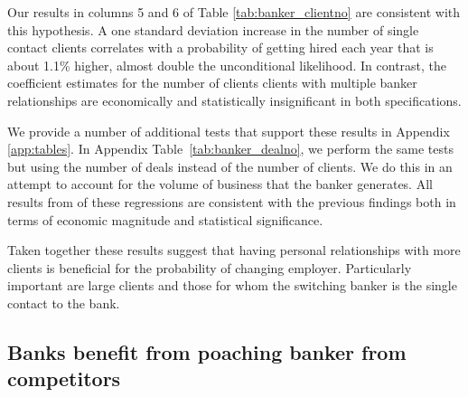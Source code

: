Our results in columns 5 and 6 of Table \ref{tab:banker_clientno} are consistent with this hypothesis. A one standard deviation increase in the number of single contact clients correlates with a probability of getting hired each year that is about 1.1\% higher, almost double the unconditional likelihood. In contrast, the coefficient estimates for the number of clients clients with multiple banker relationships are economically and statistically insignificant in both specifications. %

We provide a number of additional tests that support these results in Appendix \ref{app:tables}. In Appendix Table~\ref{tab:banker_dealno}, we perform the same tests but using the number of deals instead of the number of clients. We do this in an attempt to account for the volume of business that the banker generates.%
All results from of these regressions are consistent with the previous findings both in terms of economic magnitude and statistical significance.

Taken together these results suggest that having personal relationships with more clients is beneficial for the probability of changing employer. Particularly important are large clients and those for whom the switching banker is the single contact to the bank. 

\subsection{Banks benefit from poaching banker from competitors} \label{sec:initiation}

